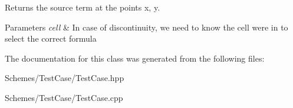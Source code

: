 Returns the source term at the points x, y. 


\begin{DoxyParams}{Parameters}
{\em cell} & In case of discontinuity, we need to know the cell we\textquotesingle{}re in to select the correct formula \\
\hline
\end{DoxyParams}


The documentation for this class was generated from the following files\+:\begin{DoxyCompactItemize}
\item 
Schemes/\+Test\+Case/Test\+Case.\+hpp\item 
Schemes/\+Test\+Case/Test\+Case.\+cpp\end{DoxyCompactItemize}
